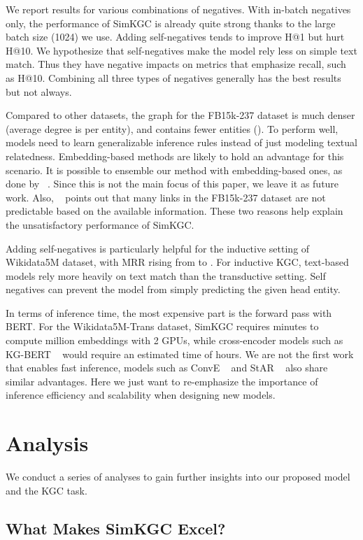 \documentclass[11pt]{article}
\begin{document}
We report results for various combinations of negatives.
With in-batch negatives only,
the performance of SimKGC is already quite strong
thanks to the large batch size (1024) we use.
Adding self-negatives tends to improve H@1 but hurt H@10.
We hypothesize that self-negatives make the model rely less on simple text match.
Thus they have negative impacts on metrics that emphasize recall,
such as H@10.
Combining all three types of negatives generally has the best results but not always.

Compared to other datasets,
the graph for the FB15k-237 dataset
is much denser (average degree is  per entity),
and contains fewer entities ().
To perform well,
models need to learn generalizable inference rules
instead of just modeling textual relatedness.
Embedding-based methods are likely to hold an advantage for this scenario.
It is possible to ensemble our method with embedding-based ones,
as done by ~\citet{wang2021structure}.
Since this is not the main focus of this paper,
we leave it as future work.
Also,
~\citet{cao-etal-2021-missing} points out that
many links in the FB15k-237 dataset are not predictable based on the available information.
These two reasons help explain the unsatisfactory performance of SimKGC.

Adding self-negatives is particularly helpful for the inductive setting of Wikidata5M dataset,
with MRR rising from  to .
For inductive KGC,
text-based models rely more heavily on text match than the transductive setting.
Self negatives can prevent the model from simply predicting the given head entity.

In terms of inference time,
the most expensive part is the forward pass with BERT.
For the Wikidata5M-Trans dataset,
SimKGC requires  minutes to compute  million embeddings with 2 GPUs,
while cross-encoder models such as KG-BERT ~\citep{yao2019kg}
would require an estimated time of  hours.
We are not the first work that enables fast inference,
models such as ConvE ~\citep{dettmers2018convolutional} and StAR ~\citep{wang2021structure}
also share similar advantages.
Here we just want to re-emphasize the importance of inference efficiency and scalability
when designing new models.

\section{Analysis}
We conduct a series of analyses to gain further insights
into our proposed model and the KGC task.

\subsection{What Makes SimKGC Excel?}
\end{document}
